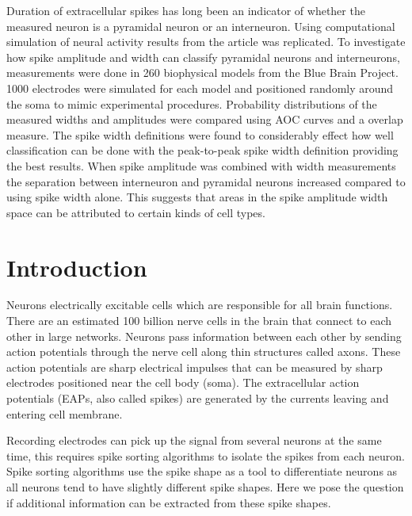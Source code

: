 \documentclass[altfont, fleqn]{uiophd}
\begin{document}
Duration of extracellular spikes has long been an indicator 
of whether the measured neuron is a pyramidal neuron or an interneuron. 
Using computational simulation of neural activity results
from the article 
\Textcite{pettersen_amplitude_2008}
was replicated.
To investigate how spike amplitude
and width can classify pyramidal neurons and interneurons,
measurements were done 
in 260 biophysical models
from the Blue Brain Project. 
1000 electrodes were simulated
for each model and
positioned randomly around the soma to mimic
experimental procedures.
Probability distributions of the measured widths and amplitudes
were compared using AOC curves and a overlap measure. 
The spike width definitions were found to considerably effect
how well classification can be done with 
the peak-to-peak spike width definition providing the best results. 
When spike amplitude was combined with width measurements 
the separation between
interneuron and pyramidal neurons increased compared 
to using spike width alone.
This suggests that areas in the spike amplitude width space 
can be attributed to certain kinds of cell types. 

\setcounter{tocdepth}{1}
\startcontents
\tableofcontents
\chapter{Introduction}

Neurons electrically excitable cells which
are responsible for all brain functions.
There are an estimated 100 billion nerve cells in the brain
that connect to each other in large networks. 
Neurons pass information between each other by 
sending action potentials through the nerve cell 
along thin structures called axons. 
These action potentials
are sharp electrical impulses that can be measured by
sharp electrodes positioned near the cell body (soma). 
The extracellular action potentials (EAPs, also called spikes)
are generated by the currents leaving and entering cell membrane.

Recording electrodes can pick up the signal from several 
neurons at the same time, this requires spike sorting algorithms
to isolate the spikes from each neuron. 
Spike sorting algorithms use the spike shape as a tool to
differentiate neurons as all neurons tend to have slightly
different spike shapes. 
Here we pose the question if additional information can be
extracted from these spike shapes. 
\end{document}
